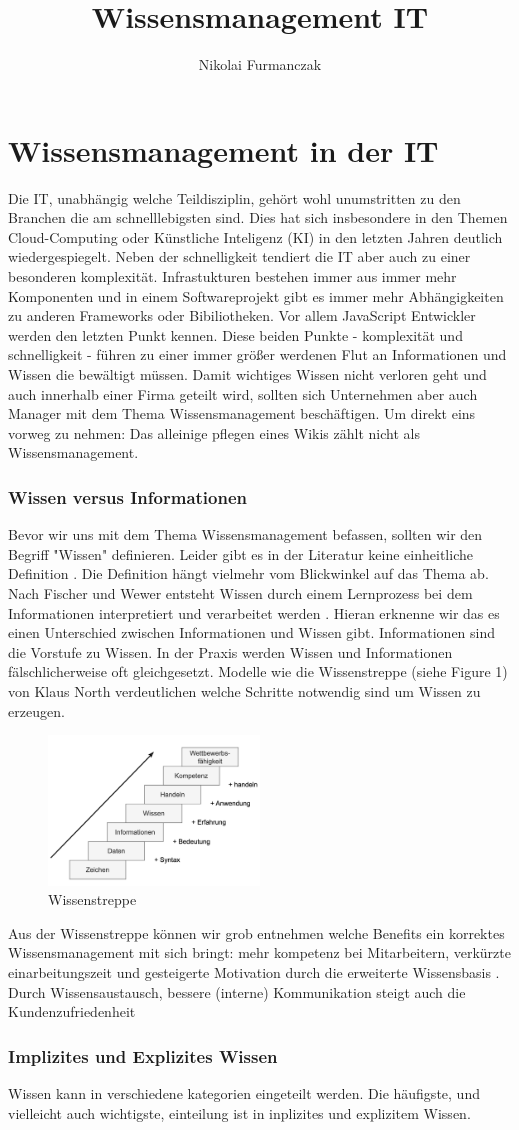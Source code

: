 \documentclass{article}
\title{Wissensmanagement IT}
\author{Nikolai Furmanczak}
\begin{document}
\section*{Wissensmanagement in der IT}
Die IT, unabhängig welche Teildisziplin, gehört wohl unumstritten zu den Branchen die am schnelllebigsten sind. Dies hat sich insbesondere in den Themen Cloud-Computing oder Künstliche Inteligenz (KI) in den letzten Jahren deutlich wiedergespiegelt. Neben der schnelligkeit tendiert die IT aber auch zu einer besonderen komplexität. Infrastukturen bestehen immer aus immer mehr Komponenten und in einem Softwareprojekt gibt es immer mehr Abhängigkeiten zu anderen Frameworks oder Bibiliotheken. Vor allem JavaScript Entwickler werden den letzten Punkt kennen. Diese beiden Punkte - komplexität und schnelligkeit - führen zu einer immer größer werdenen Flut an Informationen und Wissen die  bewältigt müssen. Damit wichtiges Wissen nicht verloren geht und auch innerhalb einer Firma geteilt wird, sollten sich Unternehmen aber auch Manager mit dem Thema Wissensmanagement beschäftigen. Um direkt eins vorweg zu nehmen: Das alleinige pflegen eines Wikis zählt nicht als Wissensmanagement.
\subsubsection*{Wissen versus Informationen}
Bevor wir uns mit dem Thema Wissensmanagement befassen, sollten wir den Begriff "Wissen" definieren. Leider gibt es in der Literatur keine einheitliche Definition \parencite{ReinmannRothmeierMandl2000}. Die Definition hängt vielmehr vom Blickwinkel auf das Thema ab. Nach Fischer und Wewer entsteht Wissen durch einem Lernprozess bei dem Informationen interpretiert und verarbeitet werden \parencite*[p. 2]{FischerWewer2021}. Hieran erknenne wir das es einen Unterschied zwischen Informationen und Wissen gibt. Informationen sind die Vorstufe zu Wissen. In der Praxis werden Wissen und Informationen fälschlicherweise oft gleichgesetzt. Modelle wie die Wissenstreppe (siehe Figure 1) von Klaus North verdeutlichen welche Schritte notwendig sind um Wissen zu erzeugen.   
\begin{figure}
    \centering
    \includegraphics[width=0.5\textwidth]{images/wissenstreppe.png}
    \caption{Wissenstreppe}
    \label{fig:meinBild}
  \end{figure}
Aus der Wissenstreppe können wir grob entnehmen welche Benefits ein korrektes Wissensmanagement mit sich bringt: mehr kompetenz bei Mitarbeitern, verkürzte einarbeitungszeit und gesteigerte Motivation durch die erweiterte Wissensbasis \parencite{NorthSchmidt2004}. Durch Wissensaustausch, bessere (interne) Kommunikation steigt auch die Kundenzufriedenheit \parencite{NorthSchmidt2004}
\subsubsection*{Implizites und Explizites Wissen} 
Wissen kann in verschiedene kategorien eingeteilt werden. Die häufigste, und vielleicht auch wichtigste, einteilung ist in inplizites und explizitem Wissen.
\printbibliography
\end{document}
